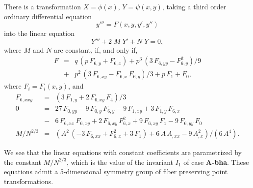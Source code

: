 \begin{re}
There is a transformation $X=\phi(x)$, $Y=\psi(x,y)$, taking 
a third order ordinary differential equation 
\begin{equation}
y'''=F(x,y,y',y'')
\end{equation}
into the linear equation 
\begin{equation}
Y'''+2\;M\;Y'+N\;Y=0,
\end{equation}
where $M$ and $N$ are constant, if, and only if, 
\begin{eqnarray}
F&=&q\,(p\,F_{6,y} + F_{6,x}) + p^{3}\,(3\,F_{6,yy} - F_{6,y}^{2})/9 
\nonumber \\
&+& p^{2}\,(3\,F_{6,xy} - F_{6,x}\,F_{6,y})/3 + p\,F_{1} + F_{0},
\end{eqnarray}
where $F_{i}=F_{i}(x,y)$, and 
\begin{eqnarray}
F_{6,xxy}&=& (3\,F_{1,y} + 2\,F_{6,xy}\,F_{4})/3 \\
0&=&27\,F_{0,yy} - 9\,F_{0,y}\,F_{6,y} - 9\,F_{1,xy} + 3\,F_{1,y}\,F_{6,x} 
\nonumber \\
&-& 6\,F_{6,xx}\,F_{6,xy} + 2\,F_{6,xy}\,F_{6,x}^{2} + 9\,F_{6,xy}\,F_{1} 
- 9\,F_{6,yy}\,F_{0} \\
M/N^{2/3}&=&(A^{2}\,( - 3\,F_{6,xx} + F_{6,x}^{2} + 3\,F_{1}) 
+ 6\,A\,A_{,xx} - 9\,A_{,x}^{2})/(6\,A^{4}).
\end{eqnarray}
\end{re}
We see that the linear equations with constant coefficients are 
pa\-ra\-me\-tri\-zed by the constant $M/N^{2/3}$, which is the 
value of the invariant $I_{1}$ of case {\bf A-bha}. These equations admit 
a 5-dimensional symmetry group of fiber preserving point transformations. 

